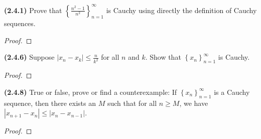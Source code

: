 \documentclass[12pt]{article}
\newcommand{\abs}[1]{\left| {#1} \right|}
\newcommand{\seq}[2][n]{\left\{ {#2} \right\}_{#1=1}^\infty}
\begin{document}
\newpage

\noindent \textbf{(2.4.1)} Prove that $\seq{\frac{n^2-1}{n^2}}$ is Cauchy using directly the definition of Cauchy sequences.

\begin{proof}
	\lipsum[1]
\end{proof}

\newpage

\noindent \textbf{(2.4.6)} Suppose $\abs{x_n-x_k}\le\frac{n}{k^2}$ for all $n$ and $k$. Show that $\seq{x_n}$ is Cauchy.

\begin{proof}
	\lipsum[1]
\end{proof}

\newpage

\noindent \textbf{(2.4.8)} True or false, prove or find a counterexample: If $\seq{x_n}$ is a Cauchy sequence, then there exists an $M$ such that for all $n\ge M$, we have $\abs{x_{n+1}-x_n}\le\abs{x_n-x_{n-1}}$.

\begin{proof}
	\lipsum[1]
\end{proof}
\end{document}
